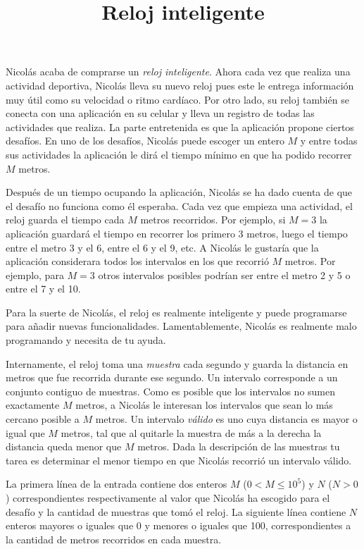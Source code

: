 \documentclass{oci}
\title{Reloj inteligente}
\begin{document}
\begin{problemDescription}
  Nicolás acaba de comprarse un \emph{reloj inteligente}.
  Ahora cada vez que realiza una actividad deportiva, Nicolás lleva su nuevo
  reloj pues este le entrega información muy útil como su velocidad o ritmo
  cardíaco.
  Por otro lado, su reloj también se conecta con una aplicación en su celular y
  lleva un registro de todas las actividades que realiza.
  La parte entretenida es que la aplicación propone ciertos desafíos.
  En uno de los desafíos, Nicolás puede escoger un entero $M$ y entre todas sus
  actividades la aplicación le dirá el tiempo mínimo en que ha podido recorrer
  $M$ metros.

  Después de un tiempo ocupando la aplicación, Nicolás se ha dado cuenta de que el
  desafío no funciona como él esperaba.
  Cada vez que empieza una actividad, el reloj guarda el tiempo cada $M$
  metros recorridos.
  Por ejemplo, si $M=3$ la aplicación guardará el tiempo en
  recorrer los primero 3 metros, luego el tiempo entre el metro 3 y
  el 6, entre el 6 y el 9, etc.
  A Nicolás le gustaría que la aplicación considerara todos los intervalos en
  los que recorrió $M$ metros.
  Por ejemplo, para $M=3$ otros intervalos posibles podrían ser entre el
  metro 2 y 5 o entre el 7 y el 10.

  Para la suerte de Nicolás, el reloj es realmente inteligente y puede
  programarse para añadir nuevas funcionalidades.
  Lamentablemente, Nicolás es realmente malo programando y necesita de tu ayuda.

  Internamente, el reloj toma una \emph{muestra} cada segundo y guarda la
  distancia en metros que fue recorrida durante ese segundo.
  Un intervalo corresponde a un conjunto contiguo de muestras.
  Como es posible que los intervalos no sumen exactamente $M$ metros, a
  Nicolás le interesan los intervalos que sean lo más cercano posible a $M$
  metros.
  Un intervalo \emph{válido} es uno cuya distancia es mayor o igual que $M$ metros,
  tal que al quitarle la muestra de más a la derecha la distancia queda menor
  que $M$ metros.
  Dada la descripción de las muestras tu tarea es determinar el menor tiempo en
  que Nicolás recorrió un intervalo válido.
\end{problemDescription}

\begin{inputDescription}
  La primera línea de la entrada contiene dos enteros $M$ ($0<M\leq 10^5$) y $N$
  ($N > 0$) correspondientes respectivamente al valor que Nicolás ha escogido
  para el desafío y la cantidad de muestras que tomó el reloj.
  La siguiente línea contiene $N$ enteros mayores o iguales que 0 y menores o
  iguales que 100, correspondientes a la cantidad de metros recorridos en cada
  muestra.
\end{inputDescription}
\end{document}
